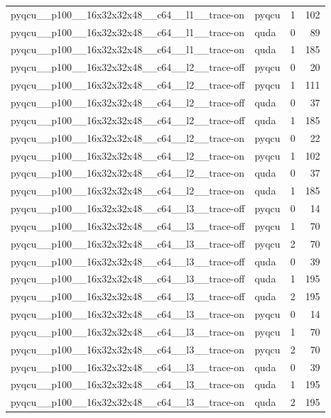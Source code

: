 \begin{table}[htbp]
\begin{tabular}{@{}llrr@{}}
pyqcu\_\_p100\_\_16x32x32x48\_\_c64\_\_l1\_\_trace-on & pyqcu & 1 & 102 \\
pyqcu\_\_p100\_\_16x32x32x48\_\_c64\_\_l1\_\_trace-on & quda & 0 & 89 \\
pyqcu\_\_p100\_\_16x32x32x48\_\_c64\_\_l1\_\_trace-on & quda & 1 & 185 \\
pyqcu\_\_p100\_\_16x32x32x48\_\_c64\_\_l2\_\_trace-off & pyqcu & 0 & 20 \\
pyqcu\_\_p100\_\_16x32x32x48\_\_c64\_\_l2\_\_trace-off & pyqcu & 1 & 111 \\
pyqcu\_\_p100\_\_16x32x32x48\_\_c64\_\_l2\_\_trace-off & quda & 0 & 37 \\
pyqcu\_\_p100\_\_16x32x32x48\_\_c64\_\_l2\_\_trace-off & quda & 1 & 185 \\
pyqcu\_\_p100\_\_16x32x32x48\_\_c64\_\_l2\_\_trace-on & pyqcu & 0 & 22 \\
pyqcu\_\_p100\_\_16x32x32x48\_\_c64\_\_l2\_\_trace-on & pyqcu & 1 & 102 \\
pyqcu\_\_p100\_\_16x32x32x48\_\_c64\_\_l2\_\_trace-on & quda & 0 & 37 \\
pyqcu\_\_p100\_\_16x32x32x48\_\_c64\_\_l2\_\_trace-on & quda & 1 & 185 \\
pyqcu\_\_p100\_\_16x32x32x48\_\_c64\_\_l3\_\_trace-off & pyqcu & 0 & 14 \\
pyqcu\_\_p100\_\_16x32x32x48\_\_c64\_\_l3\_\_trace-off & pyqcu & 1 & 70 \\
pyqcu\_\_p100\_\_16x32x32x48\_\_c64\_\_l3\_\_trace-off & pyqcu & 2 & 70 \\
pyqcu\_\_p100\_\_16x32x32x48\_\_c64\_\_l3\_\_trace-off & quda & 0 & 39 \\
pyqcu\_\_p100\_\_16x32x32x48\_\_c64\_\_l3\_\_trace-off & quda & 1 & 195 \\
pyqcu\_\_p100\_\_16x32x32x48\_\_c64\_\_l3\_\_trace-off & quda & 2 & 195 \\
pyqcu\_\_p100\_\_16x32x32x48\_\_c64\_\_l3\_\_trace-on & pyqcu & 0 & 14 \\
pyqcu\_\_p100\_\_16x32x32x48\_\_c64\_\_l3\_\_trace-on & pyqcu & 1 & 70 \\
pyqcu\_\_p100\_\_16x32x32x48\_\_c64\_\_l3\_\_trace-on & pyqcu & 2 & 70 \\
pyqcu\_\_p100\_\_16x32x32x48\_\_c64\_\_l3\_\_trace-on & quda & 0 & 39 \\
pyqcu\_\_p100\_\_16x32x32x48\_\_c64\_\_l3\_\_trace-on & quda & 1 & 195 \\
pyqcu\_\_p100\_\_16x32x32x48\_\_c64\_\_l3\_\_trace-on & quda & 2 & 195 \\

\end{tabular}
\end{table}
